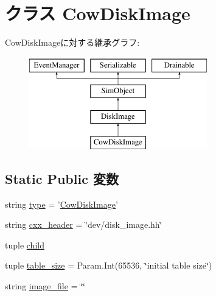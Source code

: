 \hypertarget{classDiskImage_1_1CowDiskImage}{
\section{クラス CowDiskImage}
\label{classDiskImage_1_1CowDiskImage}
}
CowDiskImageに対する継承グラフ:\begin{figure}[H]
\begin{center}
\leavevmode
\includegraphics[height=4cm]{classDiskImage_1_1CowDiskImage}
\end{center}
\end{figure}
\subsection*{Static Public 変数}
\begin{DoxyCompactItemize}
\item 
string \hyperlink{classDiskImage_1_1CowDiskImage_acce15679d830831b0bbe8ebc2a60b2ca}{type} = '\hyperlink{classDiskImage_1_1CowDiskImage}{CowDiskImage}'
\item 
string \hyperlink{classDiskImage_1_1CowDiskImage_a17da7064bc5c518791f0c891eff05fda}{cxx\_\-header} = \char`\"{}dev/disk\_\-image.hh\char`\"{}
\item 
tuple \hyperlink{classDiskImage_1_1CowDiskImage_a74580d02ef7af2ae9bcc43f9032eb7fb}{child}
\item 
tuple \hyperlink{classDiskImage_1_1CowDiskImage_ad67ffd2dbd3d2f980bf246ac3108800d}{table\_\-size} = Param.Int(65536, \char`\"{}initial table size\char`\"{})
\item 
string \hyperlink{classDiskImage_1_1CowDiskImage_a0ee2b1c488c3337173db75b5d28a1f63}{image\_\-file} = \char`\"{}\char`\"{}
\end{DoxyCompactItemize}


